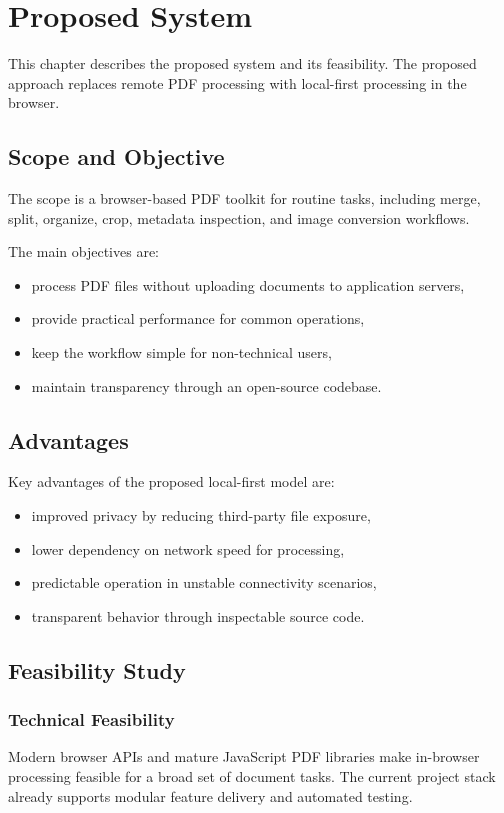 \section{Proposed System}
This chapter describes the proposed system and its feasibility. The proposed approach replaces remote PDF processing with local-first processing in the browser.

\subsection{Scope and Objective}
The scope is a browser-based PDF toolkit for routine tasks, including merge, split, organize, crop, metadata inspection, and image conversion workflows.

The main objectives are:
\begin{itemize}
  \item process PDF files without uploading documents to application servers,
  \item provide practical performance for common operations,
  \item keep the workflow simple for non-technical users,
  \item maintain transparency through an open-source codebase.
\end{itemize}

\subsection{Advantages}
Key advantages of the proposed local-first model are:
\begin{itemize}
  \item improved privacy by reducing third-party file exposure,
  \item lower dependency on network speed for processing,
  \item predictable operation in unstable connectivity scenarios,
  \item transparent behavior through inspectable source code.
\end{itemize}

\subsection{Feasibility Study}
\subsubsection{Technical Feasibility}
Modern browser APIs and mature JavaScript PDF libraries make in-browser processing feasible for a broad set of document tasks. The current project stack already supports modular feature delivery and automated testing.


